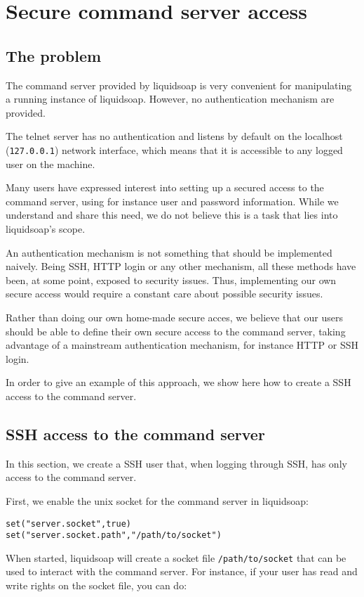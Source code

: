 \section{Secure command server access}
\subsection{The problem}
The command server provided by liquidsoap is very convenient for 
manipulating a running instance of liquidsoap. However, no authentication
mechanism are provided. 

The telnet server has no authentication and listens
by default on the localhost (\verb+127.0.0.1+) network interface,
which means that it is accessible to any logged user on the machine.

Many users have expressed interest into setting up a secured access
to the command server, using for instance user and password information.
While we understand and share this need, we do not believe this 
is a task that lies into liquidsoap's scope.

An authentication mechanism is not something that should be implemented 
naively. Being SSH, HTTP login or any other mechanism, all these methods
have been, at some point, exposed to security issues. Thus, implementing
our own secure access would require a constant care about possible security
issues.

Rather than doing our own home-made secure acces, we believe that our users should be 
able to define their own secure access to the command server, taking advantage of a 
mainstream authentication mechanism, for instance HTTP or SSH login.

In order to give an example of this approach, we show here how to create
a SSH access to the command server.

\subsection{SSH access to the command server}
In this section, we create a SSH user that, when logging through SSH, 
has only access to the command server. 

First, we enable the unix socket for the command server in liquidsoap:

\begin{verbatim}
set("server.socket",true) 
set("server.socket.path","/path/to/socket")
\end{verbatim}
When started, liquidsoap will create a socket file \verb+/path/to/socket+
that can be used to interact with the command server. For instance,
if your user has read and write rights on the socket file, you can do:

